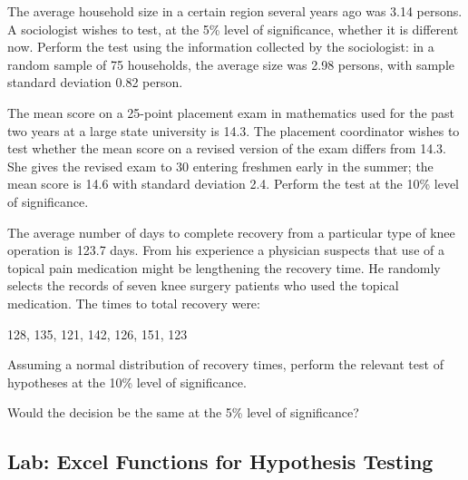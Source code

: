 \begin{exercise}

The average household size in a certain region several years ago was
3.14 persons. A sociologist wishes to test, at the 5\% level of
significance, whether it is different now. Perform the test using the
information collected by the sociologist: in a random sample of 75
households, the average size was 2.98 persons, with sample standard
deviation 0.82 person.

\end{exercise}
\vspace*{8\baselineskip}

\begin{exercise}

The mean score on a 25-point placement exam in mathematics used for the
past two years at a large state university is 14.3. The placement
coordinator wishes to test whether the mean score on a revised version
of the exam differs from 14.3. She gives the revised exam to 30 entering
freshmen early in the summer; the mean score is 14.6 with standard
deviation 2.4. Perform the test at the 10\% level of significance.

\end{exercise}
\vspace*{8\baselineskip}

\begin{exercise}

The average number of days to complete recovery from a particular type
of knee operation is 123.7 days. From his experience a physician
suspects that use of a topical pain medication might be lengthening the
recovery time. He randomly selects the records of seven knee surgery
patients who used the topical medication. The times to total recovery
were:

128, 135, 121, 142, 126, 151, 123

Assuming a normal distribution of recovery times, perform the relevant
test of hypotheses at the 10\% level of significance.

Would the decision be the same at the 5\% level of significance?

\end{exercise}
\vspace*{8\baselineskip}

\hypertarget{lab-excel-functions-for-hypothesis-testing}{%
\subsection{Lab: Excel Functions for Hypothesis
Testing}\label{lab-excel-functions-for-hypothesis-testing}}

